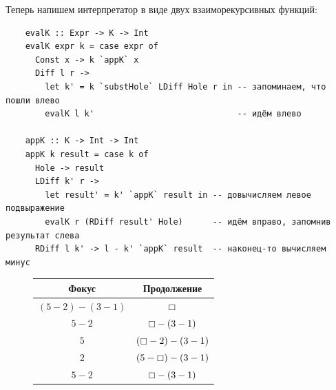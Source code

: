 Теперь напишем интерпретатор в виде двух взаиморекурсивных функций:
\begin{verbatim}
    evalK :: Expr -> K -> Int
    evalK expr k = case expr of
      Const x -> k `appK` x
      Diff l r ->
        let k' = k `substHole` LDiff Hole r in -- запоминаем, что пошли влево
        evalK l k'                             -- идём влево

    appK :: K -> Int -> Int
    appK k result = case k of
      Hole -> result
      LDiff k' r ->
        let result' = k' `appK` result in -- довычисляем левое подвыражение
        evalK r (RDiff result' Hole)      -- идём вправо, запомнив результат слева
      RDiff l k' -> l - k' `appK` result  -- наконец-то вычисляем минус
\end{verbatim}






\begin{figure}
    \centering
    \begin{tabular}{|c|c|}
        \hline
        Фокус               & Продолжение                 \\
        \hline
        $(5 - 2) - (3 - 1)$ & $\boxempty$                 \\
        $5 - 2$             & $\boxempty - (3 - 1)$       \\
        $5$                 & $(\boxempty - 2) - (3 - 1)$ \\
        $2$                 & $(5 - \boxempty) - (3 - 1)$ \\
        $5 - 2$             & $\boxempty - (3 - 1)$       \\
        \hline
    \end{tabular}
\end{figure}

